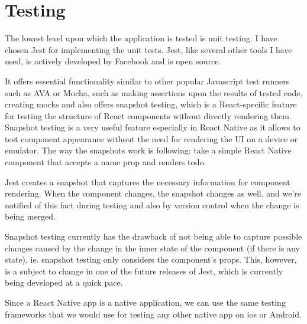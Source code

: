 \chapter{Testing}

The lowest level upon which the application is tested is unit testing. I have chosen Jest for implementing the unit tests. Jest, like several other tools I have used, is actively developed by Facebook and is open source. 

It offers essential functionality similar to other popular Javascript test runners such as AVA or Mocha, such as making assertions upon the results of tested code, creating mocks and also offers snapshot testing, which is a React-specific feature for testing the structure of React components without directly rendering them. Snapshot testing is a very useful feature especially in React Native as it allows to test component appearance without the need for rendering the UI on a device or emulator. 
The way the snapshots work is following: take a simple React Native component that accepts a name prop and renders todo. 

Jest creates a snapshot that captures the necessary information for component rendering. When the component changes, the snapshot changes as well, and we're notified of this fact during testing and also by version control when the change is being merged. 

Snapshot testing currently has the drawback of not being able to capture possible changes caused by the change in the inner state of the component (if there is any state), ie. snapshot testing only considers the component’s props. This, however, is a subject to change in one of the future releases of Jest, which is currently being developed at a quick pace.

Since a React Native app is a native application, we can use the same testing frameworks that we would use for testing any other native app on ios or Android. 